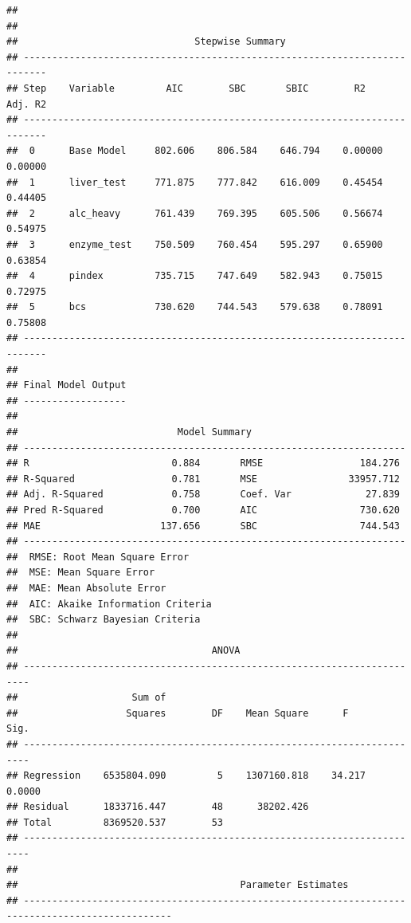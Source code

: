 \documentclass[
]{book}
\begin{document}
\begin{verbatim}
## 
## 
##                               Stepwise Summary                              
## --------------------------------------------------------------------------
## Step    Variable         AIC        SBC       SBIC        R2       Adj. R2 
## --------------------------------------------------------------------------
##  0      Base Model     802.606    806.584    646.794    0.00000    0.00000 
##  1      liver_test     771.875    777.842    616.009    0.45454    0.44405 
##  2      alc_heavy      761.439    769.395    605.506    0.56674    0.54975 
##  3      enzyme_test    750.509    760.454    595.297    0.65900    0.63854 
##  4      pindex         735.715    747.649    582.943    0.75015    0.72975 
##  5      bcs            730.620    744.543    579.638    0.78091    0.75808 
## --------------------------------------------------------------------------
## 
## Final Model Output 
## ------------------
## 
##                            Model Summary                            
## -------------------------------------------------------------------
## R                         0.884       RMSE                 184.276 
## R-Squared                 0.781       MSE                33957.712 
## Adj. R-Squared            0.758       Coef. Var             27.839 
## Pred R-Squared            0.700       AIC                  730.620 
## MAE                     137.656       SBC                  744.543 
## -------------------------------------------------------------------
##  RMSE: Root Mean Square Error 
##  MSE: Mean Square Error 
##  MAE: Mean Absolute Error 
##  AIC: Akaike Information Criteria 
##  SBC: Schwarz Bayesian Criteria 
## 
##                                  ANOVA                                  
## -----------------------------------------------------------------------
##                    Sum of                                              
##                   Squares        DF    Mean Square      F         Sig. 
## -----------------------------------------------------------------------
## Regression    6535804.090         5    1307160.818    34.217    0.0000 
## Residual      1833716.447        48      38202.426                     
## Total         8369520.537        53                                    
## -----------------------------------------------------------------------
## 
##                                       Parameter Estimates                                        
## ------------------------------------------------------------------------------------------------

\end{verbatim}
\end{document}
